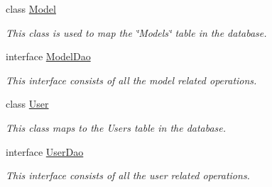 \begin{DoxyCompactItemize}
class \hyperlink{classorg_1_1jboss_1_1as_1_1quickstarts_1_1greeter_1_1domain_1_1_model}{Model}
\begin{DoxyCompactList}\small\item\em This class is used to map the \char`\"{}\+Models\char`\"{} table in the database. \end{DoxyCompactList}\item 
interface \hyperlink{interfaceorg_1_1jboss_1_1as_1_1quickstarts_1_1greeter_1_1domain_1_1_model_dao}{Model\+Dao}
\begin{DoxyCompactList}\small\item\em This interface consists of all the model related operations. \end{DoxyCompactList}\item 
class \hyperlink{classorg_1_1jboss_1_1as_1_1quickstarts_1_1greeter_1_1domain_1_1_user}{User}
\begin{DoxyCompactList}\small\item\em This class maps to the Users table in the database. \end{DoxyCompactList}\item 
interface \hyperlink{interfaceorg_1_1jboss_1_1as_1_1quickstarts_1_1greeter_1_1domain_1_1_user_dao}{User\+Dao}
\begin{DoxyCompactList}\small\item\em This interface consists of all the user related operations. \end{DoxyCompactList}\end{DoxyCompactItemize}

